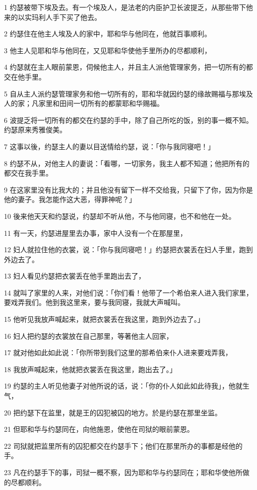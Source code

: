 \par 1 约瑟被带下埃及去。有一个埃及人，是法老的内臣护卫长波提乏，从那些带下他来的以实玛利人手下买了他去。
\par 2 约瑟住在他主人埃及人的家中，耶和华与他同在，他就百事顺利。
\par 3 他主人见耶和华与他同在，又见耶和华使他手里所办的尽都顺利，
\par 4 约瑟就在主人眼前蒙恩，伺候他主人，并且主人派他管理家务，把一切所有的都交在他手里。
\par 5 自从主人派约瑟管理家务和他一切所有的，耶和华就因约瑟的缘故赐福与那埃及人的家；凡家里和田间一切所有的都蒙耶和华赐福。
\par 6 波提乏将一切所有的都交在约瑟的手中，除了自己所吃的饭，别的事一概不知。约瑟原来秀雅俊美。
\par 7 这事以後，约瑟主人的妻以目送情给约瑟，说：「你与我同寝吧！」
\par 8 约瑟不从，对他主人的妻说：「看哪，一切家务，我主人都不知道；他把所有的都交在我手里。
\par 9 在这家里没有比我大的；并且他没有留下一样不交给我，只留下了你，因为你是他的妻子。我怎能作这大恶，得罪神呢？」
\par 10 後来他天天和约瑟说，约瑟却不听从他，不与他同寝，也不和他在一处。
\par 11 有一天，约瑟进屋里去办事，家中人没有一个在那屋里，
\par 12 妇人就拉住他的衣裳，说：「你与我同寝吧！」约瑟把衣裳丢在妇人手里，跑到外边去了。
\par 13 妇人看见约瑟把衣裳丢在他手里跑出去了，
\par 14 就叫了家里的人来，对他们说：「你们看！他带了一个希伯来人进入我们家里，要戏弄我们。他到我这里来，要与我同寝，我就大声喊叫。
\par 15 他听见我放声喊起来，就把衣裳丢在我这里，跑到外边去了。」
\par 16 妇人把约瑟的衣裳放在自己那里，等著他主人回家，
\par 17 就对他如此如此说：「你所带到我们这里的那希伯来仆人进来要戏弄我，
\par 18 我放声喊起来，他就把衣裳丢在我这里，跑出去了。」
\par 19 约瑟的主人听见他妻子对他所说的话，说：「你的仆人如此如此待我」，他就生气，
\par 20 把约瑟下在监里，就是王的囚犯被囚的地方。於是约瑟在那里坐监。
\par 21 但耶和华与约瑟同在，向他施恩，使他在司狱的眼前蒙恩。
\par 22 司狱就把监里所有的囚犯都交在约瑟手下；他们在那里所办的事都是经他的手。
\par 23 凡在约瑟手下的事，司狱一概不察，因为耶和华与约瑟同在；耶和华使他所做的尽都顺利。

